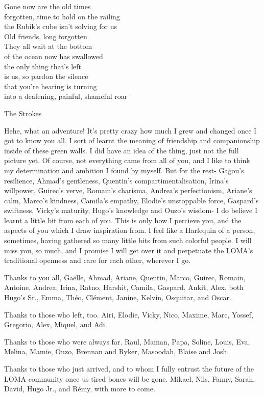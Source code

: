 
\epigraph{Gone now are the old times\\
forgotten, time to hold on the railing\\
the Rubik's cube isn't solving for us\\
Old friends, long forgotten\\
They all wait at the bottom\\
of the ocean now has swallowed\\
the only thing that's left \\
is us, so pardon the silence\\
that you're hearing is turning\\
into a deafening, painful, shameful roar}{The Strokes}


Hehe, what an adventure! It's pretty crazy how much I grew and changed once I got to know you all. I sort of learnt the meaning of friendship and companionship inside of these green walls. I did have an idea of the thing, just not the full picture yet. Of course, not everything came from all of you, and I like to think my determination and ambition I found by myself. But for the rest- Gagou's resilience, Ahmad's gentleness, Quentin's compartimentalisation, Irina's willpower, Guirec's verve, Romain's charisma, Andrea's perfectionism, Ariane's calm, Marco's kindness, Camila's empathy, Elodie's unstoppable force, Gaspard's swiftness, Vicky's maturity, Hugo's knowledge and Ouzo's wisdom- I do believe I learnt a little bit from each of you. This is only how I percieve you, and the aspects of you which I draw inspiration from. I feel like a Harlequin of a person, sometimes, having gathered so many little bits from such colorful people. I will miss you, so much, and I promise I will get over it and perpetuate the LOMA's traditional openness and care for each other, wherever I go. 

Thanks to you all, Gaëlle, Ahmad, Ariane, Quentin, Marco, Guirec, Romain, Antoine, Andrea, Irina, Ratno, Harshit, Camila, Gaspard, Ankit, Alex, both Hugo's Sr., Emma, Théo, Clément, Janine, Kelvin, Osquitar, and Oscar.

Thanks to those who left, too. Airi, Elodie, Vicky, Nico, Maxime, Marc, Yossef, Gregorio, Alex, Miquel, and Adi.

Thanks to those who were always far. Raul, Maman, Papa, Soline, Louis, Eva, Melina, Mamie, Ouzo, Brennan and Ryker, Masoodah, Blaise and Josh.

Thanks to those who just arrived, and to whom I fully entrust the future of the LOMA community once us tired bones will be gone. Mikael, Nils, Fanny, Sarah, David, Hugo Jr., and Rémy, with more to come.

